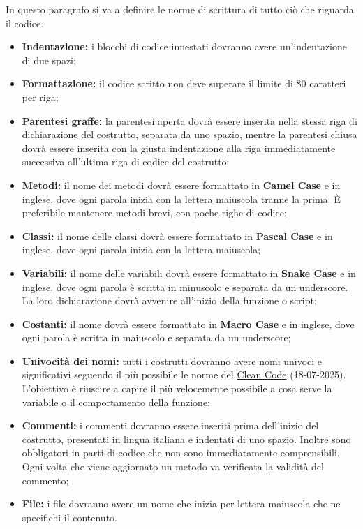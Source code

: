 \label{ref:stile}
In questo paragrafo si va a definire le norme di scrittura di tutto ciò che riguarda il codice.
\begin{itemize}
    \item \textbf{Indentazione:} i blocchi di codice innestati dovranno avere un’indentazione di due spazi;
    \item \textbf{Formattazione:} il codice scritto non deve superare il limite di 80 caratteri per riga;
    \item \textbf{Parentesi graffe:} la parentesi aperta dovrà essere inserita nella stessa riga di dichiarazione del
    costrutto, separata da uno spazio, mentre la parentesi chiusa dovrà essere inserita con la giusta
    indentazione alla riga immediatamente successiva all’ultima riga di codice del costrutto;
    \item \textbf{Metodi:} il nome dei metodi dovrà essere formattato in \textbf{Camel Case} e in inglese, dove ogni parola inizia con la lettera maiuscola tranne la prima.
    È preferibile mantenere metodi brevi, con poche righe di codice;
    \item \textbf{Classi:} il nome delle classi dovrà essere formattato in \textbf{Pascal Case} e in inglese, dove ogni parola inizia con la lettera maiuscola;
    \item \textbf{Variabili:} il nome delle variabili dovrà essere formattato in \textbf{Snake Case} e in inglese, dove ogni parola è scritta in minuscolo e separata da un underscore.
    La loro dichiarazione dovrà avvenire all’inizio della funzione o script;
    \item \textbf{Costanti:} il nome dovrà essere formattato in \textbf{Macro Case} e in inglese, dove ogni parola è scritta in maiuscolo e separata da un underscore;
    \item \textbf{Univocità dei nomi:} tutti i costrutti dovranno avere nomi univoci e significativi seguendo il più possibile le norme del \href{https://medium.com/@pabashani.herath/clean-code-naming-conventions-4cac223de3c6#77bb}{Clean Code} (18-07-2025).\\
    L'obiettivo è riuscire a capire il più velocemente possibile a cosa serve la variabile o il comportamento della funzione;
    \item \textbf{Commenti:} i commenti dovranno essere inseriti prima dell’inizio del costrutto, presentati in lingua
    italiana e indentati di uno spazio. Inoltre sono obbligatori in parti di codice che non sono immediatamente comprensibili.
    Ogni volta che viene aggiornato un metodo va verificata la validità del commento;
    \item \textbf{File:} i file dovranno avere un nome che inizia per lettera maiuscola che ne specifichi il contenuto.
\end{itemize}

